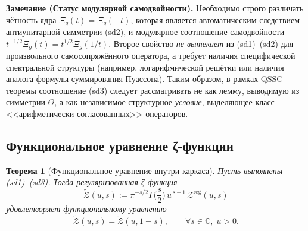 \documentclass{article}
\numberwithin{equation}{section}
\theoremstyle{plain}
\newtheorem{theorem}{Теорема}
\theoremstyle{definition}
\theoremstyle{remark}
\begin{document}
\medskip
\noindent
\textbf{Замечание (Статус модулярной самодвойности).}
Необходимо строго различать чётность ядра $\Xi_g(t)=\Xi_g(-t)$, которая является автоматическим следствием антиунитарной симметрии (sd2), 
и модулярное соотношение самодвойности $t^{-1/2}\Xi_g(t)=t^{1/2}\Xi_g(1/t)$. Второе свойство \emph{не вытекает} 
из (sd1)--(sd2) для произвольного самосопряжённого оператора, а требует наличия специфической спектральной структуры 
(например, логарифмической решётки или наличия аналога формулы суммирования Пуассона). 
Таким образом, в рамках QSSC-теоремы соотношение (sd3) следует рассматривать не как лемму, 
выводимую из симметрии $\Theta$, а как независимое структурное \emph{условие}, 
выделяющее класс <<арифметически-согласованных>> операторов.
\medskip

\subsection{Функциональное уравнение ζ-функции}
\label{subsec:functional_eq}

\begin{theorem}[Функциональное уравнение внутри каркаса]
\label{thm:functional_eq}
Пусть выполнены (sd1)–(sd3). Тогда регуляризованная ζ-функция
\begin{equation}
\label{eq:Ztilde}
\widetilde{\mathcal Z}(u,s)
:=\pi^{-s/2}\Gamma\!\Big(\frac s2\Big)\,u^{\,s-1}\,\mathcal Z^{\mathrm{reg}}(u,s)
\end{equation}
удовлетворяет функциональному уравнению
\begin{equation}
\label{eq:FE}
\widetilde{\mathcal Z}(u,s)=\widetilde{\mathcal Z}(u,1-s),
\qquad \forall s\in\mathbb C,\;u>0.
\end{equation}
\end{theorem}
\end{document}
